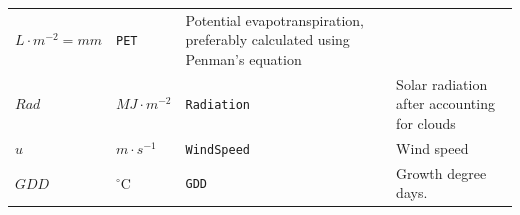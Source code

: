 \documentclass[]{book}
\begin{document}
\begin{longtable}[]{@{}llll@{}}
\begin{minipage}[t]{0.10\columnwidth}
\(L \cdot m^{-2} = mm\)\strut
\end{minipage} & \begin{minipage}[t]{0.12\columnwidth}\raggedright\strut
\texttt{PET}\strut
\end{minipage} & \begin{minipage}[t]{0.45\columnwidth}\raggedright\strut
Potential evapotranspiration, preferably calculated using Penman's
equation\strut
\end{minipage}\tabularnewline
\begin{minipage}[t]{0.11\columnwidth}\raggedright\strut
\(Rad\)\strut
\end{minipage} & \begin{minipage}[t]{0.10\columnwidth}\raggedright\strut
\(MJ \cdot m^{-2}\)\strut
\end{minipage} & \begin{minipage}[t]{0.12\columnwidth}\raggedright\strut
\texttt{Radiation}\strut
\end{minipage} & \begin{minipage}[t]{0.45\columnwidth}\raggedright\strut
Solar radiation after accounting for clouds\strut
\end{minipage}\tabularnewline
\begin{minipage}[t]{0.11\columnwidth}\raggedright\strut
\(u\)\strut
\end{minipage} & \begin{minipage}[t]{0.10\columnwidth}\raggedright\strut
\(m \cdot s^{-1}\)\strut
\end{minipage} & \begin{minipage}[t]{0.12\columnwidth}\raggedright\strut
\texttt{WindSpeed}\strut
\end{minipage} & \begin{minipage}[t]{0.45\columnwidth}\raggedright\strut
Wind speed\strut
\end{minipage}\tabularnewline
\begin{minipage}[t]{0.11\columnwidth}\raggedright\strut
\(GDD\)\strut
\end{minipage} & \begin{minipage}[t]{0.10\columnwidth}\raggedright\strut
\(^{\circ} \mathrm{C}\)\strut
\end{minipage} & \begin{minipage}[t]{0.12\columnwidth}\raggedright\strut
\texttt{GDD}\strut
\end{minipage} & \begin{minipage}[t]{0.45\columnwidth}\raggedright\strut
Growth degree days.\strut
\end{minipage}\tabularnewline
\bottomrule
\end{longtable}
\end{document}
